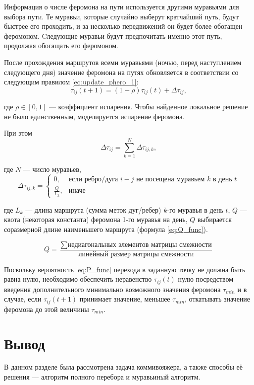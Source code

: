 Информация о числе феромона на пути используется другими муравьями для выбора пути. 
Те муравьи, которые случайно выберут кратчайший путь, будут быстрее его проходить, и за несколько передвижений он будет более обогащен феромоном. 
Cледующие муравьи будут предпочитать именно этот путь, продолжая обогащать его феромоном. 

После прохождения маршрутов всеми муравьями (ночью, перед наступлением следующего дня) значение феромона на путях обновляется в соответствии со следующим правилом \eqref{eq:update_phero_1}:
\begin{equation}
	\label{eq:update_phero_1}
	\tau_{ij}(t+1) = (1-\rho)\tau_{ij}(t) + \Delta \tau_{ij},
\end{equation}

где $\rho \in [0, 1]$ --- коэффициент испарения. 
Чтобы найденное локальное решение не было единственным, моделируется испарение феромона.

При этом
\begin{equation}
	\label{update_phero_2}
	\Delta \tau_{ij} = \sum_{k=1}^N \Delta\tau_{ij, k},
\end{equation}

где $N$ --- число муравьев,
\begin{equation}
	\label{update_phero_3}
	\Delta\tau_{ij,k} = 
	\begin{cases}
		0,  & \textrm{если ребро/дуга $i-j$ не посещена муравьем $k$ в день $t$} \\
		\frac{Q}{L_{k}}, & \textrm{иначе} 
	\end{cases}
\end{equation}

где $L_{k}$ --- длина маршрута (сумма меток дуг/ребер) $k$-го муравья в день $t$, $Q$ --- квота (некоторая константа) феромона 1-го муравья на день, $Q$ выбирается соразмерной длине наименьшего маршрута (формула \ref{eq:Q_func}).

\begin{equation}
	\label{eq:Q_func}
	 Q = \frac{\sum \text{недиагональных элементов матрицы смежности}}{\text{линейный размер матрицы смежности}}
\end{equation}

Поскольку вероятность \ref{eq:P_func} перехода в заданную точку не должна быть равна нулю, необходимо обеспечить неравенство $\tau_{ij}(t)$ нулю посредством введения дополнительного минимально возможного значения феромона $\tau_{min}$  и в случае, если $\tau_{ij}(t+1)$ принимает значение, меньшее $\tau_{min}$, откатывать значение феромона до этой величины $\tau_{min}$.

\section*{Вывод}

В данном разделе была рассмотрена задача коммивояжера, а также способы её решения --- алгоритм полного перебора и муравьиный алгоритм.
